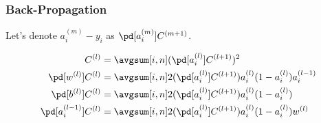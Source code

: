 \documentclass{article}
\begin{document}
\subsubsection{Back-Propagation}

Let's denote $a_i^{(m)} - y_i$ as $\pd[a_i^{(m)}]C^{(m+1)}$.

\begin{align}
	C^{(l)} &= \avgsum[i, n] (\pd[a_i^{(l)}]C^{(l+1)})^2 \\
	\pd[w^{(l)}]C^{(l)} &= \avgsum[i, n] 2(\pd[a_i^{(l)}]C^{(l+1)})a_i^{(l)}(1 - a_i^{(l)})a_i^{(l-1)} \\
	\pd[b^{(l)}]C^{(l)} &= \avgsum[i, n] 2(\pd[a_i^{(l)}]C^{(l+1)})a_i^{(l)}(1 - a_i^{(l)}) \\
	\pd[a_i^{(l-1)}]C^{(l)} &= \avgsum[i, n] 2(\pd[a_i^{(l)}]C^{(l+1)})a_i^{(l)}(1 - a_i^{(l)})w^{(l)}
\end{align}
\end{document}
